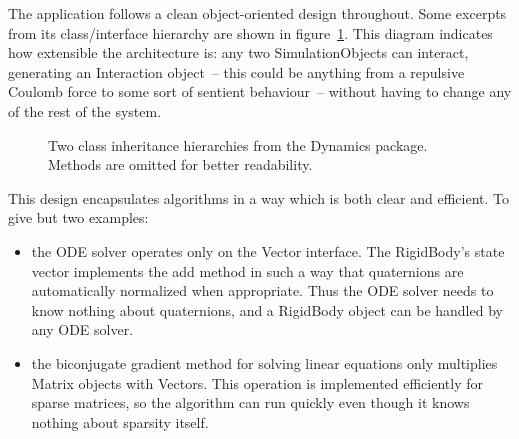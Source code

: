 The application follows a clean object-oriented design throughout. Some excerpts from its
class/interface hierarchy are shown in figure~\ref{classHierarchy}. This diagram indicates how
extensible the architecture is: any two \textsf{SimulationObject}s can interact, generating an
\textsf{Interaction} object~-- this could be anything from a repulsive Coulomb force to some
sort of sentient behaviour~-- without having to change any of the rest of the system.

\begin{figure}
\centerline{}
\caption{Two class inheritance hierarchies from the Dynamics package. Methods are omitted for
    better readability.\label{classHierarchy}}
\end{figure}

This design encapsulates algorithms in a way which is both clear and efficient. To give but two
examples:
\begin{itemize}
\item the ODE solver operates only on the \textsf{Vector} interface. The \textsf{RigidBody}'s
    state vector implements the \textsf{add} method in such a way that quaternions are
    automatically normalized when appropriate. Thus the ODE solver needs to know nothing about
    quaternions, and a \textsf{RigidBody} object can be handled by any ODE solver.
\item the biconjugate gradient method for solving linear equations only multiplies \textsf{Matrix}
    objects with \textsf{Vector}s. This operation is implemented efficiently for sparse matrices,
    so the algorithm can run quickly even though it knows nothing about sparsity itself.
\end{itemize}


